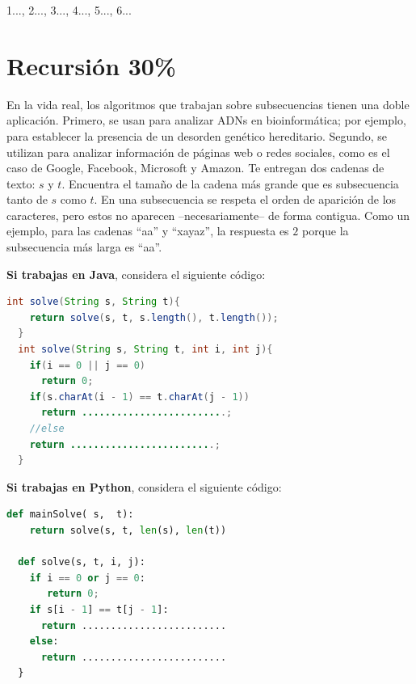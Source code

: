 \documentclass[10 pt]{article}
\begin{document}
1..., 2..., 3..., 4..., 5..., 6...



\newpage

\section{Recursión 30\%}
En la vida real, los algoritmos que trabajan sobre subsecuencias tienen una doble aplicación. Primero, se usan para analizar ADNs
en bioinformática; por ejemplo, para establecer la presencia de un desorden genético hereditario. Segundo, se utilizan para analizar
información de páginas web o redes sociales, como es el caso de Google, Facebook, Microsoft y Amazon. 
Te entregan dos cadenas de texto: $s$ y $t$. Encuentra el tamaño de la cadena más grande que es subsecuencia tanto de $s$ como $t$.
En una subsecuencia se respeta el orden de aparición de los caracteres, pero estos no aparecen --necesariamente-- de forma contigua. 
  Como un ejemplo, para las cadenas ``aa'' y ``xayaz'', la respuesta es $2$ porque la subsecuencia más larga es ``aa''.


 \hspace{1cm}


\textbf{Si trabajas en Java}, considera el siguiente código:

  \begin{lstlisting}[language=Java]
  int solve(String s, String t){
    return solve(s, t, s.length(), t.length()); 
  }
  int solve(String s, String t, int i, int j){
    if(i == 0 || j == 0) 
      return 0;
    if(s.charAt(i - 1) == t.charAt(j - 1))
      return .........................;
    //else
    return .........................;
  }
  \end{lstlisting}
  

  \textbf{Si trabajas en Python}, considera el siguiente código:

  \begin{lstlisting}[language=Python]
  def mainSolve( s,  t):
    return solve(s, t, len(s), len(t)) 
  
  def solve(s, t, i, j):
    if i == 0 or j == 0: 
       return 0;
    if s[i - 1] == t[j - 1]:
      return .........................
    else:
      return .........................
  }
  \end{lstlisting}
\end{document}
